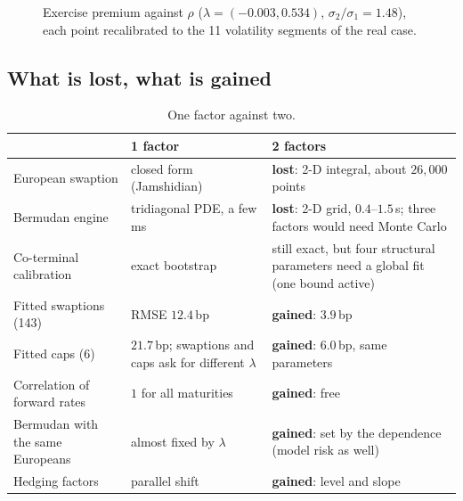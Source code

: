 \documentclass[11pt,a4paper]{article}
\theoremstyle{definition}
\theoremstyle{remark}
\begin{document}
\begin{figure}[ht]\centering
{}
\caption{Exercise premium against $\rho$ ($\lambda=(-0.003,0.534)$, $\sigma_2/\sigma_1=1.48$), each point recalibrated to the 11 volatility segments of the real case.}\label{fig:rho2f}
\end{figure}

\subsection{What is lost, what is gained}
\begin{table}[ht]\centering\small
\begin{tabular}{p{3.6cm}p{4.6cm}p{6.2cm}}\toprule
 & 1 factor & 2 factors\\\midrule
European swaption & closed form (Jamshidian) & \textbf{lost}: 2-D integral, about $26{,}000$ points\\
Bermudan engine & tridiagonal PDE, a few ms & \textbf{lost}: 2-D grid, $0.4$--$1.5\,$s; three factors would need Monte Carlo\\
Co-terminal calibration & exact bootstrap & still exact, but four structural parameters need a global fit (one bound active)\\
Fitted swaptions (143) & RMSE $12.4\,$bp & \textbf{gained}: $3.9\,$bp\\
Fitted caps (6) & $21.7\,$bp; swaptions and caps ask for different $\lambda$ & \textbf{gained}: $6.0\,$bp, same parameters\\
Correlation of forward rates & $1$ for all maturities & \textbf{gained}: free\\
Bermudan with the same Europeans & almost fixed by $\lambda$ & \textbf{gained}: set by the dependence (model risk as well)\\
Hedging factors & parallel shift & \textbf{gained}: level and slope\\\bottomrule
\end{tabular}
\caption{One factor against two.}\label{tab:perte}
\end{table}
\end{document}
